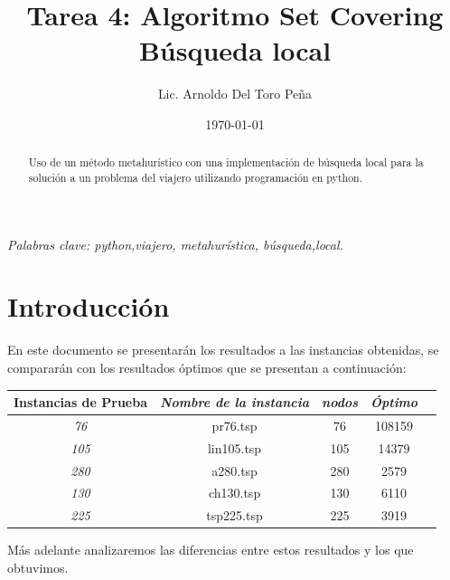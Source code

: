 \documentclass[12pt,a4paper]{article}
\author{Lic. Arnoldo Del Toro Peña}
\title{Tarea 4: Algoritmo Set Covering \\ Búsqueda local}
\date{\today}
\begin{document}
\maketitle



\thispagestyle{empty}
\begin{abstract}
    Uso de un método metahurístico con una implementación de búsqueda local para la solución a un problema del viajero utilizando programación en python.
\end{abstract}
{\centering \textit{Palabras clave: python,viajero, metahurística, búsqueda,local.}}
\section{Introducción}
En este documento se presentarán los resultados a las instancias obtenidas, se compararán con los resultados óptimos que se presentan a continuación:
\begin{table}[h!]
\centering
\begin{tabular}{|c|c|c|c|c|}
\hline
\multicolumn{1}{|l|}{\textbf{Instancias de Prueba}} & \multicolumn{1}{l|}{\textit{Nombre de la instancia}}  & \multicolumn{1}{c|}{\textit{nodos}} & \textit{Óptimo} \\ \hline
\textit{76}                                          &  pr76.tsp                                & 76                            & 108159            \\ \hline
\textit{105}                                          & lin105.tsp                                 & 105                            & 14379             \\ \hline
\textit{280}                                          & a280.tsp                                 & 280                           &2579            \\ \hline
\textit{130}                                          & ch130.tsp                                 & 130                            & 6110             \\ \hline
\textit{225}                                          & tsp225.tsp                                 & 225                            & 3919             \\ \hline

\end{tabular}
\end{table}

Más adelante analizaremos las diferencias entre estos resultados y los que obtuvimos.
\end{document}
